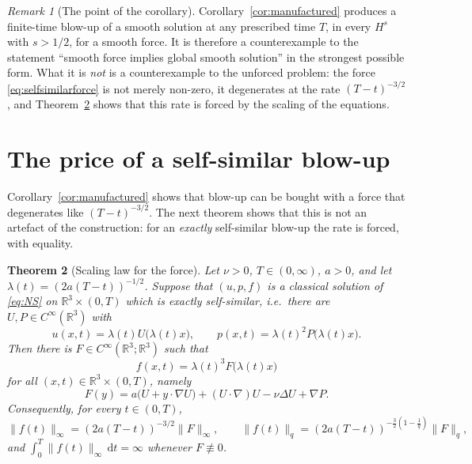 \documentclass[11pt]{article}
\newtheorem{theorem}{Theorem}[section]
\theoremstyle{remark}
\newtheorem{remark}[theorem]{Remark}
\newcommand{\R}{\mathbb{R}}
\newcommand{\dd}{\,\mathrm{d}}
\newcommand{\norm}[1]{\lVert #1\rVert}
\begin{document}
\begin{remark}[The point of the corollary]\label{rem:manufactured}
Corollary~\ref{cor:manufactured} produces a finite-time blow-up of a smooth solution at any
prescribed time $T$, in every $H^s$ with $s>1/2$, for a smooth force. It is therefore a
counterexample to the statement ``smooth force implies global smooth solution'' in the
strongest possible form. What it is \emph{not} is a counterexample to the unforced problem:
the force \eqref{eq:selfsimilarforce} is not merely non-zero, it degenerates at the rate
$(T-t)^{-3/2}$, and Theorem~\ref{thm:price} shows that this rate is forced by the scaling of
the equations.
\end{remark}

\section{The price of a self-similar blow-up}\label{sec:price}

Corollary~\ref{cor:manufactured} shows that blow-up can be bought with a force that
degenerates like $(T-t)^{-3/2}$. The next theorem shows that this is not an artefact of the
construction: for an \emph{exactly} self-similar blow-up the rate is forced, with equality.

\begin{theorem}[Scaling law for the force]\label{thm:price}
Let $\nu>0$, $T\in(0,\infty)$, $a>0$, and let
$\lambda(t)=(2a(T-t))^{-1/2}$. Suppose that $(u,p,f)$ is a classical solution of \eqref{eq:NS}
on $\R^3\times(0,T)$ which is exactly self-similar, i.e.\ there are
$U,P\in C^\infty(\R^3)$ with
\begin{equation}\label{eq:selfsimsol}
u(x,t)=\lambda(t)U\bigl(\lambda(t)x\bigr),
\qquad
p(x,t)=\lambda(t)^2P\bigl(\lambda(t)x\bigr).
\end{equation}
Then there is $F\in C^\infty(\R^3;\R^3)$ such that
\begin{equation}\label{eq:selfsimforce2}
f(x,t)=\lambda(t)^3F\bigl(\lambda(t)x\bigr)
\end{equation}
for all $(x,t)\in\R^3\times(0,T)$, namely
\begin{equation}\label{eq:Fformula}
F(y)=a\bigl(U+y\cdot\nabla U\bigr)+(U\cdot\nabla)U-\nu\Delta U+\nabla P .
\end{equation}
Consequently, for every $t\in(0,T)$,
\begin{equation}\label{eq:exactrate}
\norm{f(t)}_{\infty}=(2a(T-t))^{-3/2}\norm{F}_{\infty},
\qquad
\norm{f(t)}_{q}=(2a(T-t))^{-\frac32(1-\frac1q)}\norm{F}_{q},
\end{equation}
and $\int_0^T\norm{f(t)}_{\infty}\dd t=\infty$ whenever $F\not\equiv0$.
\end{theorem}
\end{document}
